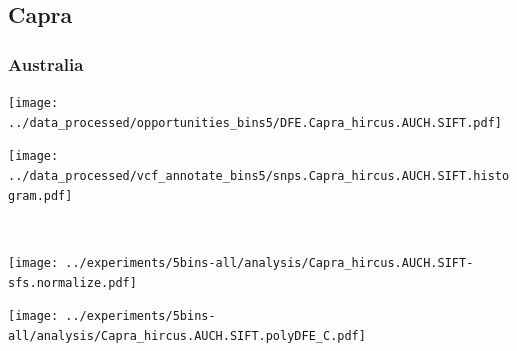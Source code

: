 \subsection{Capra}

\subsubsection{Australia}

\begin{minipage}{0.49\linewidth}
    \texttt{[image: ../data\_processed/opportunities\_bins5/DFE.Capra\_hircus.AUCH.SIFT.pdf]}
\end{minipage}
\begin{minipage}{0.49\linewidth}
    \texttt{[image: ../data\_processed/vcf\_annotate\_bins5/snps.Capra\_hircus.AUCH.SIFT.histogram.pdf]}
\end{minipage}
\\
\begin{minipage}{0.49\linewidth}
    \texttt{[image: ../experiments/5bins-all/analysis/Capra\_hircus.AUCH.SIFT-sfs.normalize.pdf]}
\end{minipage}
\begin{minipage}{0.4\linewidth}
    \texttt{[image: ../experiments/5bins-all/analysis/Capra\_hircus.AUCH.SIFT.polyDFE\_C.pdf]}
\end{minipage}
